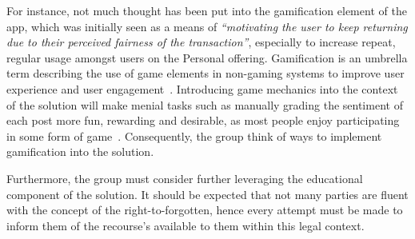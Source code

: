 For instance, not much thought has been put into the gamification element of the app, which was initially seen as a means of \emph{``motivating the user to keep returning due to their perceived fairness of the transaction''}, especially to increase repeat, regular usage amongst users on the Personal offering. Gamification is an umbrella term describing the use of game elements in non-gaming systems to improve user experience and user engagement~\parencite{deterding2011gamification}. Introducing game mechanics into the context of the solution will make menial tasks such as manually grading the sentiment of each post more fun, rewarding and desirable, as most people enjoy participating in some form of game~\parencite{hagglund2012taking}. Consequently, the group think of ways to implement gamification into the solution.

Furthermore, the group must consider further leveraging the educational component of the solution. It should be expected that not many parties are fluent with the concept of the right-to-forgotten, hence every attempt must be made to inform them of the recourse's available to them within this legal context.
